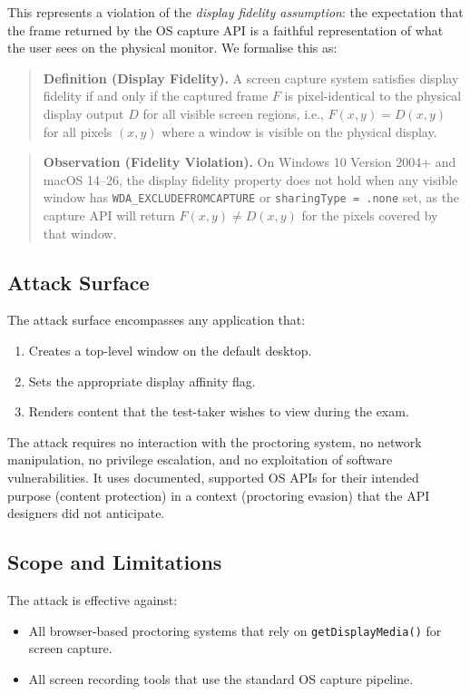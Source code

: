 \documentclass[conference]{IEEEtran}
\begin{document}
This represents a violation of the \textit{display fidelity assumption}: the expectation that the frame returned by the OS capture API is a faithful representation of what the user sees on the physical monitor. We formalise this as:

\begin{quote}
\textbf{Definition (Display Fidelity).} A screen capture system satisfies display fidelity if and only if the captured frame $F$ is pixel-identical to the physical display output $D$ for all visible screen regions, i.e., $F(x,y) = D(x,y)$ for all pixels $(x,y)$ where a window is visible on the physical display.
\end{quote}

\begin{quote}
\textbf{Observation (Fidelity Violation).} On Windows 10 Version 2004+ and macOS 14--26, the display fidelity property does not hold when any visible window has \texttt{WDA\_EXCLUDEFROMCAPTURE} or \texttt{sharingType = .none} set, as the capture API will return $F(x,y) \neq D(x,y)$ for the pixels covered by that window.
\end{quote}

\subsection{Attack Surface}

The attack surface encompasses any application that:

\begin{enumerate}
\item Creates a top-level window on the default desktop.
\item Sets the appropriate display affinity flag.
\item Renders content that the test-taker wishes to view during the exam.
\end{enumerate}

The attack requires no interaction with the proctoring system, no network manipulation, no privilege escalation, and no exploitation of software vulnerabilities. It uses documented, supported OS APIs for their intended purpose (content protection) in a context (proctoring evasion) that the API designers did not anticipate.

\subsection{Scope and Limitations}

The attack is effective against:
\begin{itemize}
\item All browser-based proctoring systems that rely on \texttt{getDisplay\allowbreak{}Media()} for screen capture.
\item All screen recording tools that use the standard OS capture pipeline.
\end{itemize}
\end{document}
